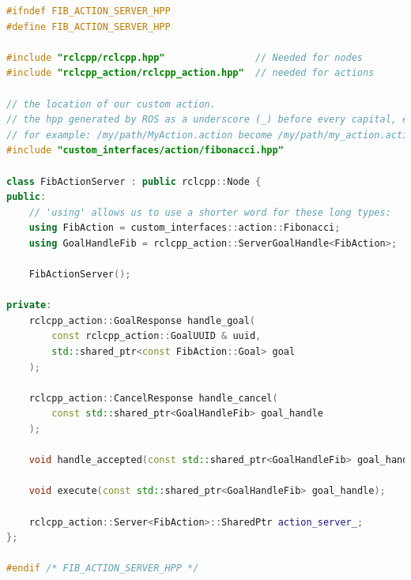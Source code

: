 \begin{lstlisting}[language=C++, caption={ActionServerNode.hpp}, firstnumber=0, label={code:action_server_hpp}]
#ifndef FIB_ACTION_SERVER_HPP
#define FIB_ACTION_SERVER_HPP

#include "rclcpp/rclcpp.hpp"                // Needed for nodes
#include "rclcpp_action/rclcpp_action.hpp"  // needed for actions

// the location of our custom action.
// the hpp generated by ROS as a underscore (_) before every capital, expect the first:
// for example: /my/path/MyAction.action become /my/path/my_action.action
#include "custom_interfaces/action/fibonacci.hpp"

class FibActionServer : public rclcpp::Node {
public:
    // 'using' allows us to use a shorter word for these long types:
    using FibAction = custom_interfaces::action::Fibonacci;
    using GoalHandleFib = rclcpp_action::ServerGoalHandle<FibAction>;

    FibActionServer();
  
private:
    rclcpp_action::GoalResponse handle_goal(
        const rclcpp_action::GoalUUID & uuid, 
        std::shared_ptr<const FibAction::Goal> goal
    );

    rclcpp_action::CancelResponse handle_cancel(
        const std::shared_ptr<GoalHandleFib> goal_handle
    );

    void handle_accepted(const std::shared_ptr<GoalHandleFib> goal_handle);

    void execute(const std::shared_ptr<GoalHandleFib> goal_handle);

    rclcpp_action::Server<FibAction>::SharedPtr action_server_;
};

#endif /* FIB_ACTION_SERVER_HPP */
\end{lstlisting}

